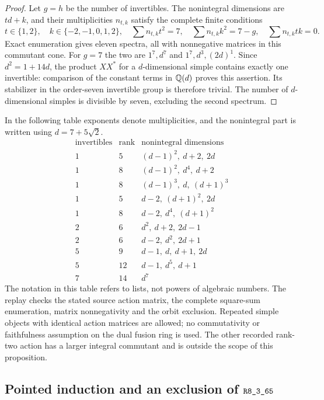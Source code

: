 \begin{proof}
Let $g=h$ be the number of invertibles.  The nonintegral dimensions
are $td+k$, and their multiplicities $n_{t,k}$ satisfy the complete
finite conditions
\[
 t\in\{1,2\},\quad k\in\{-2,-1,0,1,2\},\quad
 \sum n_{t,k}t^2=7,\quad
 \sum n_{t,k}k^2=7-g,\quad
 \sum n_{t,k}tk=0.
\]
Exact enumeration gives eleven spectra, all with nonnegative
matrices in this commutant cone.  For $g=7$ the two are
$1^7,d^7$ and $1^7,d^3,(2d)^1$.  Since $d^2=1+14d$, the product
$XX^*$ for a $d$-dimensional simple contains exactly one invertible:
comparison of the constant terms in $\mathbb Q(d)$ proves this assertion.
Its stabilizer in the order-seven invertible group is therefore
trivial.  The number of $d$-dimensional simples is divisible by
seven, excluding the second spectrum.
\end{proof}

In the following table exponents denote multiplicities, and the
nonintegral part is written using $d=7+5\sqrt2$.
\[
\begin{array}{c|r|l}
\text{invertibles}&\text{rank}&\text{nonintegral dimensions}\\\hline
1&5&(d-1)^2,\ d+2,\ 2d\\
1&8&(d-1)^2,\ d^4,\ d+2\\
1&8&(d-1)^3,\ d,\ (d+1)^3\\
1&5&d-2,\ (d+1)^2,\ 2d\\
1&8&d-2,\ d^4,\ (d+1)^2\\
2&6&d^2,\ d+2,\ 2d-1\\
2&6&d-2,\ d^2,\ 2d+1\\
5&9&d-1,\ d,\ d+1,\ 2d\\
5&12&d-1,\ d^5,\ d+1\\
7&14&d^7
\end{array}
\]
The notation in this table refers to lists, not powers of algebraic
numbers.  The replay
checks the stated source action matrix, the complete square-sum
enumeration, matrix nonnegativity and the orbit exclusion.
Repeated simple objects with identical action matrices are allowed;
no commutativity or faithfulness assumption on the dual fusion ring
is used.  The other recorded rank-two action has a larger integral
commutant and is outside the scope of this proposition.

\subsection{Pointed induction and an exclusion of
\texorpdfstring{$\sha{R8_3_65}$}{R8-3-65}}
\label{subsec:research-r65-exclusion}

